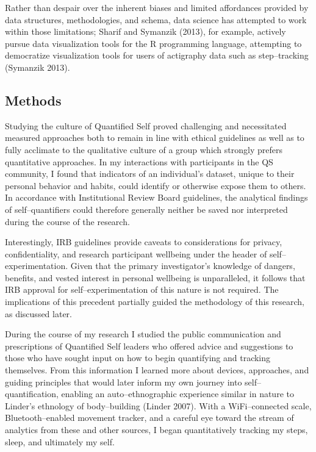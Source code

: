 \documentclass{article}
\begin{document}
Rather than despair over the inherent biases and limited affordances provided by data structures,
methodologies,
and schema,
data science has attempted to work within those limitations;
Sharif and Symanzik (2013), 
for example,
actively pursue data visualization tools for the R programming language,
attempting to democratize visualization tools for users of actigraphy data such as step--tracking
(Symanzik 2013). 

\subsection*{Methods}
Studying the culture of Quantified Self proved challenging and necessitated measured approaches both to remain in line with ethical guidelines as well as to fully acclimate to the qualitative culture of a group which strongly prefers quantitative approaches.
In my interactions with participants in the QS community,
I found that indicators of an individual's dataset,
unique to their personal behavior and habits,
could identify or otherwise expose them to others.
In accordance with Institutional Review Board guidelines,
the analytical findings of self--quantifiers could therefore generally neither be saved nor interpreted during the course of the research.

Interestingly,
IRB guidelines provide caveats to considerations for privacy,
confidentiality,
and research participant wellbeing under the header of self--experimentation.
Given that the primary investigator's knowledge of dangers,
benefits,
and vested interest in personal wellbeing is unparalleled,
it follows that IRB approval for self--experimentation of this nature is not required.
The implications of this precedent partially guided the methodology of this research,
as discussed later.

During the course of my research I studied the public communication and prescriptions of Quantified Self leaders who offered advice and suggestions to those who have sought input on how to begin quantifying and tracking themselves.
From this information I learned more about devices,
approaches,
and guiding principles that would later inform my own journey into self--quantification,
enabling an auto--ethnographic experience similar in nature to Linder's ethnology of body--building
(Linder 2007). 
With a WiFi--connected scale,
Bluetooth--enabled movement tracker,
and a careful eye toward the stream of analytics from these and other sources,
I began quantitatively tracking my steps,
sleep,
and ultimately my self.
\end{document}
